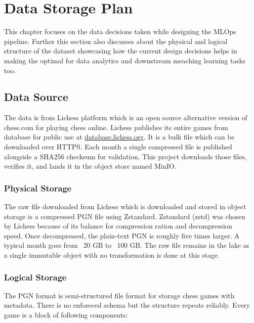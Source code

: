 \chapter{Data Storage Plan}
\label{ch:storage-planning}
This chapter focuses on the data decisions taken while designing the MLOps pipeline. Further this section also discusses about the physical and logical structure of the dataset showcasing how the current design decisions helps in making the optimal for data analytics and downstream meaching learning tasks too.  


\section{Data Source}
\label{sec:storage-source}
The data is from Lichess platform which is an open source alternative version of chess.com for playing chess online. Lichess publishes its entire games from database for public use at \url{database.lichess.org}. It is a bulk file which can be downloaded over HTTPS. Each month a single compressed file is published alongside a SHA256 checksum for validation. This project downloads those files, verifies it, and lands it in the object store named MinIO. 

\subsection{Physical Storage}
\label{sec:storage-provenance}
The raw file downloaded from Lichess which is downloaded and stored in object storage is a compressed PGN file using Zstandard. Zstandard (zstd) was chosen by Lichess because of its balance for compression ration and decompression speed. Once decompressed, the plain-text PGN is roughly five times larger. A typical month goes from ~20 GB to ~100 GB. The raw file remains in the lake as a single immutable object with no transformation is done at this stage.


\subsection{Logical Storage}
\label{sec:logical-storage}
The PGN format is semi-structured file format for storage chess games with metadata. There is no enforeced schema but the structure repeats reliably. Every game is a block of following components:

